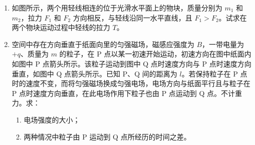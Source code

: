 \documentclass[\gkver]{gaokaozhenti}
\begin{document}
\begin{enumerate}
\item
如图所示，两个用轻线相连的位于光滑水平面上的物块，质量分别为 $m_{1}$ 和 $m_{2}$，拉力 $F_{1}$ 和 $F_{2}$ 方向相反，与轻线沿同一水平直线，且 $F_{1}>F_{2}$。试求在两个物块运动过程中轻线的拉力 $T$。
\onepicture[align=right, w=4.97cm]{}

\item
空间中存在方向垂直于纸面向里的匀强磁场，磁感应强度为 $B$，一带电量为 $+q$、质量为 $m$ 的粒子，在 P 点以某一初速开始运动，初速方向在图中纸面内如图中 P 点箭头所示。该粒子运动到图中 Q 点时速度方向与 P 点时速度方向垂直，如图中 Q 点箭头所示。已知 P、Q 间的距离为 $l$。若保持粒子在 P 点时的速度不变，而将匀强磁场换成匀强电场，电场方向与纸面平行且与粒子在 P 点时速度方向垂直，在此电场作用下粒子也由 P 点运动到 Q 点。不计重力。求：
\begin{enumerate}
	\item
	电场强度的大小；
	\item
	两种情况中粒子由 P 运动到 Q 点所经历的时间之差。
\end{enumerate}
\onepicture[align=right, w=2.83cm]{}
\end{enumerate}
\end{document}

